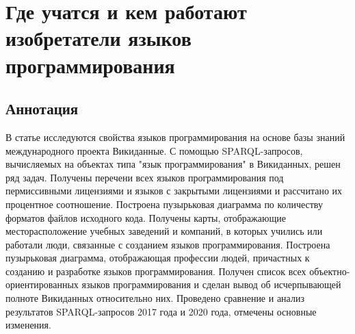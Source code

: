 \chapter{Где учатся и кем работают изобретатели языков программирования}
\label{ch:programming languages}
\section*{Аннотация}
В статье исследуются свойства языков программирования на основе базы знаний международного проекта Викиданные. С помощью SPARQL-запросов, вычисляемых на объектах типа "язык программирования" в Викиданных, решен ряд задач. Получены перечени всех языков программирования под пермиссивными лицензиями и языков с закрытыми лицензиями и рассчитано их процентное соотношение. Построена пузырьковая диаграмма по количеству форматов файлов исходного кода. Получены карты, отображающие месторасположение учебных заведений и компаний, в которых учились или работали люди, связанные с созданием языков программирования. Построена пузырьковая диаграмма, отображающая профессии людей, причастных к созданию и разработке языков программирования. Получен список всех объектно-ориентированных языков программирования и сделан вывод об исчерпывающей полноте Викиданных относительно них. Проведено сравнение и анализ результатов SPARQL-запросов 2017 года и 2020 года, отмечены основные изменения. 


